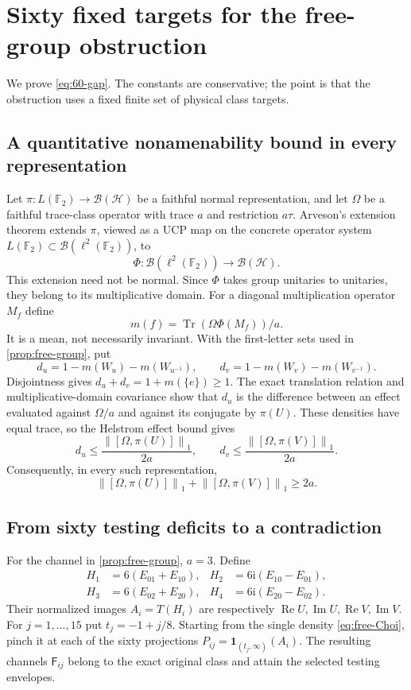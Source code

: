 \documentclass[11pt,reqno]{amsart}
\theoremstyle{definition}
\theoremstyle{remark}
\numberwithin{equation}{section}
\DeclareMathOperator{\Tr}{Tr}
\DeclareMathOperator{\Rea}{Re}
\DeclareMathOperator{\Ima}{Im}
\newcommand{\HH}{\mathcal H}
\newcommand{\B}{\mathcal B}
\newcommand{\F}{\mathsf F}
\newcommand{\one}{\mathbf 1}
\newcommand{\norm}[1]{\left\lVert#1\right\rVert}
\newcommand{\ii}{\mathrm i}
\begin{document}
\section{Sixty fixed targets for the free-group obstruction}\label{app:free-group}

We prove \eqref{eq:60-gap}. The constants are conservative; the point is that the obstruction uses a fixed finite set of physical class targets.

\subsection{A quantitative nonamenability bound in every representation}

Let $\pi:L(\mathbb F_2)\to\B(\HH)$ be a faithful normal representation, and let $\Omega$ be a faithful trace-class operator with trace $a$ and restriction $a\tau$. Arveson's extension theorem \cite[Theorem~1.2.3]{Arveson} extends $\pi$, viewed as a UCP map on the concrete operator system $L(\mathbb F_2)\subset\B(\ell^2(\mathbb F_2))$, to
\[
 \Phi:\B(\ell^2(\mathbb F_2))\to\B(\HH).
\]
This extension need not be normal. Since $\Phi$ takes group unitaries to unitaries, they belong to its multiplicative domain. For a diagonal multiplication operator $M_f$ define
\[
 m(f)=\Tr(\Omega\Phi(M_f))/a.
\]
It is a mean, not necessarily invariant. With the first-letter sets used in \cref{prop:free-group}, put
\[
 d_u=1-m(W_u)-m(W_{u^{-1}}),\qquad
 d_v=1-m(W_v)-m(W_{v^{-1}}).
\]
Disjointness gives $d_u+d_v=1+m(\{e\})\ge1$. The exact translation relation and multiplicative-domain covariance show that $d_u$ is the difference between an effect evaluated against $\Omega/a$ and against its conjugate by $\pi(U)$. These densities have equal trace, so the Helstrom effect bound gives
\[
 d_u\le\frac{\norm{[\Omega,\pi(U)]}_1}{2a},\qquad
 d_v\le\frac{\norm{[\Omega,\pi(V)]}_1}{2a}.
\]
Consequently, in every such representation,
\begin{equation}\label{eq:free-comm-gap}
 \norm{[\Omega,\pi(U)]}_1+\norm{[\Omega,\pi(V)]}_1\ge2a.
\end{equation}

\subsection{From sixty testing deficits to a contradiction}

For the channel in \cref{prop:free-group}, $a=3$. Define
\begin{align*}
 H_1&=6(E_{01}+E_{10}),& H_2&=6\ii(E_{10}-E_{01}),\\
 H_3&=6(E_{02}+E_{20}),& H_4&=6\ii(E_{20}-E_{02}).
\end{align*}
Their normalized images $A_i=T(H_i)$ are respectively $\Rea U,\Ima U,\Rea V,\Ima V$. For $j=1,\ldots,15$ put $t_j=-1+j/8$. Starting from the single density \eqref{eq:free-Choi}, pinch it at each of the sixty projections $P_{ij}=\one_{(t_j,\infty)}(A_i)$. The resulting channels $\F_{ij}$ belong to the exact original class and attain the selected testing envelopes.
\end{document}
